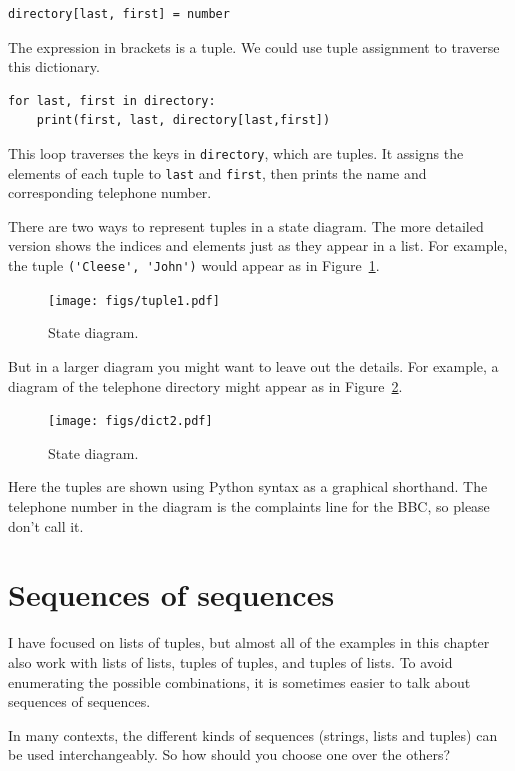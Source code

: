 \documentclass[10pt]{book}
\begin{document}
\begin{verbatim}
directory[last, first] = number
\end{verbatim}
%
The expression in brackets is a tuple.  We could use tuple
assignment to traverse this dictionary.

\begin{verbatim}
for last, first in directory:
    print(first, last, directory[last,first])
\end{verbatim}
%
This loop traverses the keys in {\tt directory}, which are tuples.  It
assigns the elements of each tuple to {\tt last} and {\tt first}, then
prints the name and corresponding telephone number.

There are two ways to represent tuples in a state diagram.  The more
detailed version shows the indices and elements just as they appear in
a list.  For example, the tuple \verb"('Cleese', 'John')" would appear
as in Figure~\ref{fig.tuple1}.

\begin{figure}
\centerline
{\texttt{[image: figs/tuple1.pdf]}}
\caption{State diagram.}
\label{fig.tuple1}
\end{figure}

But in a larger diagram you might want to leave out the
details.  For example, a diagram of the telephone directory might
appear as in Figure~\ref{fig.dict2}.

\begin{figure}
\centerline
{\texttt{[image: figs/dict2.pdf]}}
\caption{State diagram.}
\label{fig.dict2}
\end{figure}

Here the tuples are shown using Python syntax as a graphical
shorthand.  The telephone number in the diagram is the complaints line
for the BBC, so please don't call it.


\section{Sequences of sequences}

I have focused on lists of tuples, but almost all of the examples in
this chapter also work with lists of lists, tuples of tuples, and
tuples of lists.  To avoid enumerating the possible combinations, it
is sometimes easier to talk about sequences of sequences.

In many contexts, the different kinds of sequences (strings, lists and
tuples) can be used interchangeably.  So how should you choose one
over the others?
\end{document}
